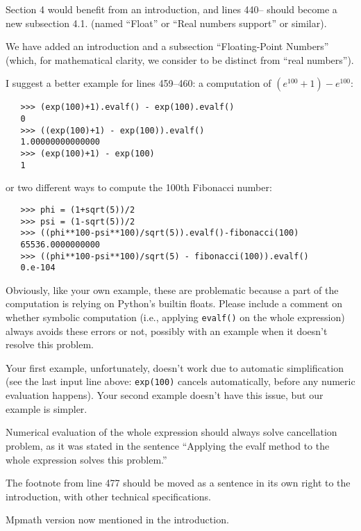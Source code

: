 \documentclass[answers,12pt]{exam}
\begin{document}
\begin{questions}
\question Section 4 would benefit from an introduction, and lines 440-- should become a new subsection 4.1. (named ``Float'' or ``Real numbers support'' or similar).
\begin{solution}
We have added an introduction and a subsection ``Floating-Point Numbers''
(which, for mathematical clarity, we consider to be distinct from ``real
numbers'').
\end{solution}

\question I suggest a better example for lines 459--460: a computation of
$(e^{100} +1) - e^{100}$:

\begin{verbatim}
   >>> (exp(100)+1).evalf() - exp(100).evalf()
   0
   >>> ((exp(100)+1) - exp(100)).evalf()
   1.00000000000000
   >>> (exp(100)+1) - exp(100)
   1
\end{verbatim}

or two different ways to compute the 100th Fibonacci number:

\begin{verbatim}
   >>> phi = (1+sqrt(5))/2
   >>> psi = (1-sqrt(5))/2
   >>> ((phi**100-psi**100)/sqrt(5)).evalf()-fibonacci(100)
   65536.0000000000
   >>> ((phi**100-psi**100)/sqrt(5) - fibonacci(100)).evalf()
   0.e-104
\end{verbatim}

Obviously, like your own example, these are problematic because a part of the computation is relying on Python's builtin floats. Please include a comment on whether symbolic computation (i.e., applying \texttt{evalf()} on the whole expression) always avoids these errors or not, possibly with an example when it doesn't resolve this problem.
\begin{solution}
  Your first example, unfortunately, doesn't work due to automatic
  simplification (see the last input line above:  \texttt{exp(100)} cancels
  automatically, before any numeric evaluation happens). Your second example
  doesn't have this issue, but our example is simpler.

Numerical evaluation of the whole expression should
always solve cancellation problem, as it was stated in the sentence
``Applying the evalf method to the whole expression solves this problem.''
\end{solution}

\question The footnote from line 477 should be moved as a sentence in its own right to the introduction, with other technical specifications.
\begin{solution}
Mpmath version now mentioned in the introduction.
\end{solution}


\end{questions}
\end{document}
